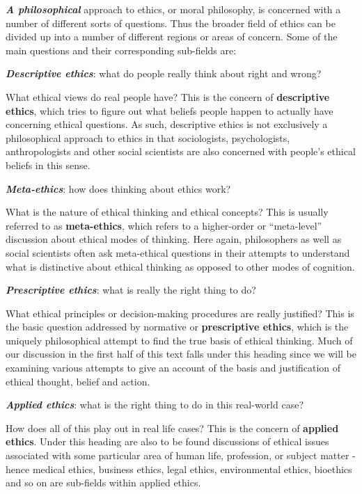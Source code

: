 \documentclass[]{book}
\makeatletter
\newenvironment{kframe}{%
\medskip{}
\setlength{\fboxsep}{.8em}
 \def\at@end@of@kframe{}%
 \ifinner\ifhmode%
  \def\at@end@of@kframe{\end{minipage}}%
  \begin{minipage}{\columnwidth}%
 \fi\fi%
 \def\FrameCommand##1{\hskip\@totalleftmargin \hskip-\fboxsep
 \colorbox{shadecolor}{##1}\hskip-\fboxsep
     \hskip-\linewidth \hskip-\@totalleftmargin \hskip\columnwidth}%
 \MakeFramed {\advance\hsize-\width
   \@totalleftmargin\z@ \linewidth\hsize
   \@setminipage}}%
 {\par\unskip\endMakeFramed%
 \at@end@of@kframe}
\newenvironment{rmdblock}[1]
  {
  \begin{itemize}
  \renewcommand{\labelitemi}{
    \raisebox{-.7\height}[0pt][0pt]{
      {\setkeys{Gin}{width=3em,keepaspectratio}\texttt{[image: img/\#1]}}
    }
  }
  \setlength{\fboxsep}{1em}
  \begin{kframe}
  \item
  }
  {
  \end{kframe}
  \end{itemize}
  }
\newenvironment{rmdnote}
  {\begin{rmdblock}{note}}
  {\end{rmdblock}}
\makeatother
\begin{document}
\textbf{\emph{A philosophical}} approach to ethics, or moral philosophy, is concerned with a number of different sorts of questions. Thus the broader field of ethics can be divided up into a number of different regions or areas of concern. Some of the main questions and their corresponding sub-fields are:

\textbf{\emph{Descriptive ethics}}: what do people really think about right and wrong?

\begin{rmdnote}
What ethical views do real people have? This is the concern of
\textbf{descriptive ethics}, which tries to figure out what beliefs
people happen to actually have concerning ethical questions. As such,
descriptive ethics is not exclusively a philosophical approach to ethics
in that sociologists, psychologists, anthropologists and other social
scientists are also concerned with people's ethical beliefs in this
sense.
\end{rmdnote}

\textbf{\emph{Meta-ethics}}: how does thinking about ethics work?

\begin{rmdnote}
What is the nature of ethical thinking and ethical concepts? This is
usually referred to as \textbf{meta-ethics}, which refers to a
higher-order or ``meta-level'' discussion about ethical modes of
thinking. Here again, philosophers as well as social scientists often
ask meta-ethical questions in their attempts to understand what is
distinctive about ethical thinking as opposed to other modes of
cognition.
\end{rmdnote}

\textbf{\emph{Prescriptive ethics}}: what is really the right thing to do?

\begin{rmdnote}
What ethical principles or decision-making procedures are really
justified? This is the basic question addressed by normative or
\textbf{prescriptive ethics}, which is the uniquely philosophical
attempt to find the true basis of ethical thinking. Much of our
discussion in the first half of this text falls under this heading since
we will be examining various attempts to give an account of the basis
and justification of ethical thought, belief and action.
\end{rmdnote}

\textbf{\emph{Applied ethics}}: what is the right thing to do in this real-world case?

\begin{rmdnote}
How does all of this play out in real life cases? This is the concern of
\textbf{applied ethics}. Under this heading are also to be found
discussions of ethical issues associated with some particular area of
human life, profession, or subject matter - hence medical ethics,
business ethics, legal ethics, environmental ethics, bioethics and so on
are sub-fields within applied ethics.
\end{rmdnote}
\end{document}
